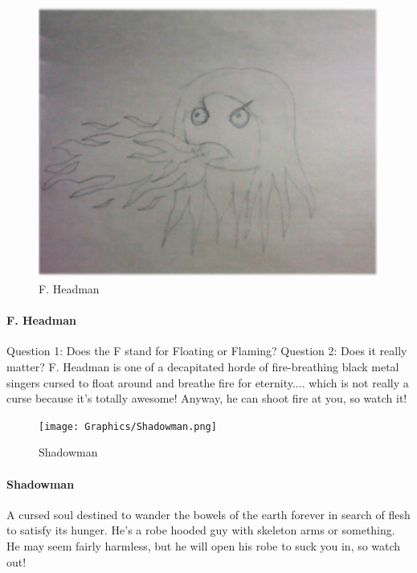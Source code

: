 \documentclass{article}
\begin{document}
\begin{figure}[h!]
\includegraphics[width=5in]{Graphics/FHeadman.png}
\caption{F. Headman}
\label{FHeadPic}
\end{figure}

\paragraph{F. Headman}
Question 1: Does the F stand for Floating or Flaming?  Question 2: Does it really matter?  F. Headman is one of a decapitated horde of fire-breathing black metal singers cursed to float around and breathe fire for eternity.... which is not really a curse because it’s totally awesome!  Anyway, he can shoot fire at you, so watch it!

\begin{figure}[h!]
\texttt{[image: Graphics/Shadowman.png]}
\caption{Shadowman}
\label{ShadowmanPic}
\end{figure}

\paragraph{Shadowman}
A cursed soul destined to wander the bowels of the earth forever in search of flesh to satisfy its hunger.  He’s a robe hooded guy with skeleton arms or something.  He may seem fairly harmless, but he will open his robe to suck you in, so watch out!
\end{document}
